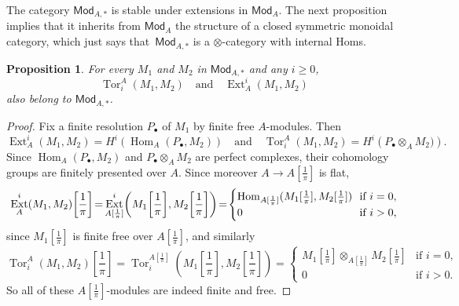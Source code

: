 \documentclass[11pt]{article}
\newtheorem{prop}[theo]{Proposition}
\theoremstyle{definition}
\numberwithin{equation}{section}
\numberwithin{figure}{section}
\numberwithin{table}{section}
\newcommand{\Mod}{\mathsf{Mod}}
\DeclareMathOperator{\Hom}{Hom}
\DeclareMathOperator{\Ext}{Ext}
\DeclareMathOperator{\Tor}{Tor}
\newcommand*{\Mk}{\mkern -2mu}
\begin{document}
The category $\Mod_{A,\ast}$ is stable under extensions in $\Mod_{A}$. The next proposition implies that it inherits from $\Mod_{A}$ the structure of a closed symmetric monoidal category, which just says that~$\Mod_{A,\ast}$ is a $\otimes$-category with internal Homs.
\begin{prop}
For every $M_{1}$ and $M_{2}$ in $\Mod_{A,\ast}$ and any $i\geq0$,
\[
\Tor_{i}^{A}(M_{1},M_{2})\quad\text{and}\quad\Ext_{A}^{i}(M_{1},M_{2})
\]
also belong to $\Mod_{A,\ast}$.
\end{prop}
\begin{proof}
Fix a finite resolution $P_{\bullet}$ of $M_{1}$ by finite free $A$-modules. Then
\[
\Ext_{A}^{i}(M_{1},M_{2})=H^{i}\left(\Hom_{A}(P_{\bullet},M_{2})\right)\quad\text{and}\quad\Tor_{i}^{A}(M_{1},M_{2})=H^{i}\left(P_{\bullet}\otimes_{A}M_{2})\right).
\]
Since $\Hom_{A}(P_{\bullet},M_{2})$ and $P_{\bullet}\otimes_{A}M_{2}$ are perfect complexes, their cohomology groups are finitely presented over $A$. Since moreover $A\rightarrow A[\frac{1}{\pi}]$ is flat,
\[
\Ext_{A}^{i}(M_{1},M_{2})\!\left[{\frac{1}{\pi}}\right]\!=\Mk\Ext_{A[{\frac{1}{\pi}}]}^{i}\!\left(M_{1}\!\left[{\frac{1}{\pi}}\right]\!,M_{2}\!\left[{\frac{1}{\pi}}\right]\right)\!=\!
\begin{cases}
\Hom_{A[{\frac{1}{\pi}}]}(M_{1}[{\frac{1}{\pi}}],M_{2}[{\frac{1}{\pi}}])\!\! & \text{if }i=0,\\
0 & \text{if }i>0,
\end{cases}
\]
since $M_{1}[{\frac{1}{\pi}}]$ is finite free over $A[{
\frac{1}{\pi}}]$, and similarly
\[
\Tor_{i}^{A}(M_{1},M_{2})\!\left[{\frac{1}{\pi}}\right]=\Tor_{i}^{A[{\frac{1}{\pi}}]}\!\left(M_{1}\!\left[{\frac{1}{\pi}}\right],M_{2}\!\left[{\frac{1}{\pi}}\right]\right)=
\begin{cases}
M_{1}[{\frac{1}{\pi}}]\otimes_{A[{\frac{1}{\pi}}]}M_{2}[{\frac{1}{\pi}}] & \text{if }i=0,\\
0 & \text{if }i>0.
\end{cases}
\]
So all of these $A[{\frac{1}{\pi}}]$-modules are indeed finite and free.
\end{proof}

\subsubsection{}\label{subsec:ModAtquasiab}
\end{document}
